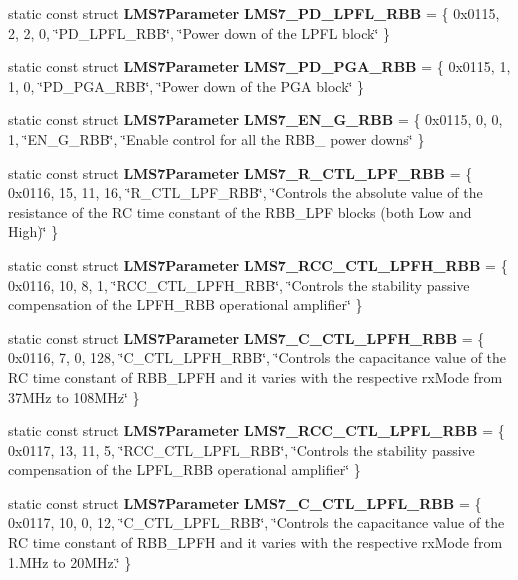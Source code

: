 \begin{DoxyCompactItemize}
\item 
static const struct {\bf L\+M\+S7\+Parameter} {\bf L\+M\+S7\+\_\+\+P\+D\+\_\+\+L\+P\+F\+L\+\_\+\+R\+BB} = \{ 0x0115, 2, 2, 0, \char`\"{}\+P\+D\+\_\+\+L\+P\+F\+L\+\_\+\+R\+B\+B\char`\"{}, \char`\"{}\+Power down of the L\+P\+F\+L block\char`\"{} \}
\item 
static const struct {\bf L\+M\+S7\+Parameter} {\bf L\+M\+S7\+\_\+\+P\+D\+\_\+\+P\+G\+A\+\_\+\+R\+BB} = \{ 0x0115, 1, 1, 0, \char`\"{}\+P\+D\+\_\+\+P\+G\+A\+\_\+\+R\+B\+B\char`\"{}, \char`\"{}\+Power down of the P\+G\+A block\char`\"{} \}
\item 
static const struct {\bf L\+M\+S7\+Parameter} {\bf L\+M\+S7\+\_\+\+E\+N\+\_\+\+G\+\_\+\+R\+BB} = \{ 0x0115, 0, 0, 1, \char`\"{}\+E\+N\+\_\+\+G\+\_\+\+R\+B\+B\char`\"{}, \char`\"{}\+Enable control for all the R\+B\+B\+\_ power downs\char`\"{} \}
\item 
static const struct {\bf L\+M\+S7\+Parameter} {\bf L\+M\+S7\+\_\+\+R\+\_\+\+C\+T\+L\+\_\+\+L\+P\+F\+\_\+\+R\+BB} = \{ 0x0116, 15, 11, 16, \char`\"{}\+R\+\_\+\+C\+T\+L\+\_\+\+L\+P\+F\+\_\+\+R\+B\+B\char`\"{}, \char`\"{}\+Controls the absolute value of the resistance of the R\+C time constant of the R\+B\+B\+\_\+\+L\+P\+F blocks (both Low and High)\char`\"{} \}
\item 
static const struct {\bf L\+M\+S7\+Parameter} {\bf L\+M\+S7\+\_\+\+R\+C\+C\+\_\+\+C\+T\+L\+\_\+\+L\+P\+F\+H\+\_\+\+R\+BB} = \{ 0x0116, 10, 8, 1, \char`\"{}\+R\+C\+C\+\_\+\+C\+T\+L\+\_\+\+L\+P\+F\+H\+\_\+\+R\+B\+B\char`\"{}, \char`\"{}\+Controls the stability passive compensation of the L\+P\+F\+H\+\_\+\+R\+B\+B operational amplifier\char`\"{} \}
\item 
static const struct {\bf L\+M\+S7\+Parameter} {\bf L\+M\+S7\+\_\+\+C\+\_\+\+C\+T\+L\+\_\+\+L\+P\+F\+H\+\_\+\+R\+BB} = \{ 0x0116, 7, 0, 128, \char`\"{}\+C\+\_\+\+C\+T\+L\+\_\+\+L\+P\+F\+H\+\_\+\+R\+B\+B\char`\"{}, \char`\"{}\+Controls the capacitance value of the R\+C time constant of R\+B\+B\+\_\+\+L\+P\+F\+H and it varies with the respective rx\+Mode from 37\+M\+Hz to 108\+M\+Hz\char`\"{} \}
\item 
static const struct {\bf L\+M\+S7\+Parameter} {\bf L\+M\+S7\+\_\+\+R\+C\+C\+\_\+\+C\+T\+L\+\_\+\+L\+P\+F\+L\+\_\+\+R\+BB} = \{ 0x0117, 13, 11, 5, \char`\"{}\+R\+C\+C\+\_\+\+C\+T\+L\+\_\+\+L\+P\+F\+L\+\_\+\+R\+B\+B\char`\"{}, \char`\"{}\+Controls the stability passive compensation of the L\+P\+F\+L\+\_\+\+R\+B\+B operational amplifier\char`\"{} \}
\item 
static const struct {\bf L\+M\+S7\+Parameter} {\bf L\+M\+S7\+\_\+\+C\+\_\+\+C\+T\+L\+\_\+\+L\+P\+F\+L\+\_\+\+R\+BB} = \{ 0x0117, 10, 0, 12, \char`\"{}\+C\+\_\+\+C\+T\+L\+\_\+\+L\+P\+F\+L\+\_\+\+R\+B\+B\char`\"{}, \char`\"{}\+Controls the capacitance value of the R\+C time constant of R\+B\+B\+\_\+\+L\+P\+F\+H and it varies with the respective rx\+Mode from 1.\+M\+Hz to 20\+M\+Hz.\char`\"{} \}

\end{DoxyCompactItemize}
